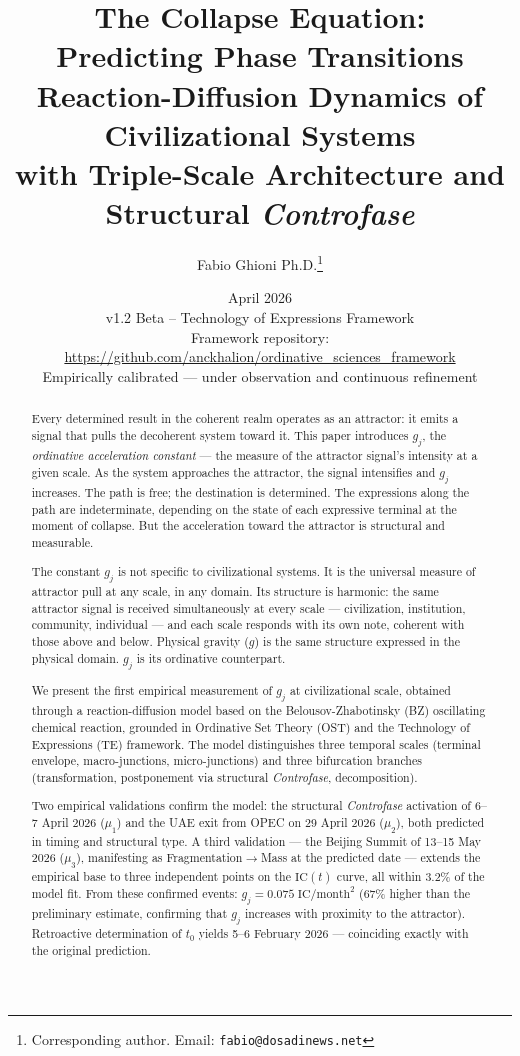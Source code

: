 \documentclass[12pt,a4paper]{article}
\title{\textbf{The Collapse Equation:\\Predicting Phase Transitions}\\[1em]\large Reaction-Diffusion Dynamics of Civilizational Systems\\with Triple-Scale Architecture and Structural \textit{Controfase}}
\author[1]{Fabio Ghioni Ph.D.\thanks{Corresponding author. Email: \texttt{fabio@dosadinews.net}}}
\affil[1]{Ordinative Sciences Foundation Research Labs\\\small\url{https://ordinativescience.foundation}}
\date{April 2026\\[0.5em]\small v1.2 Beta -- Technology of Expressions Framework\\[0.3em]\small Framework repository: \url{https://github.com/anckhalion/ordinative_sciences_framework}\\[0.3em]\small Empirically calibrated --- under observation and continuous refinement}
\newcommand{\gj}{g_j}
\newcommand{\IC}{\mathrm{IC}}
\begin{document}
\maketitle

\begin{abstract}
Every determined result in the coherent realm operates as an attractor: it emits a signal that pulls the decoherent system toward it. This paper introduces $\gj$, the \emph{ordinative acceleration constant} --- the measure of the attractor signal's intensity at a given scale. As the system approaches the attractor, the signal intensifies and $\gj$ increases. The path is free; the destination is determined. The expressions along the path are indeterminate, depending on the state of each expressive terminal at the moment of collapse. But the acceleration toward the attractor is structural and measurable.

The constant $\gj$ is not specific to civilizational systems. It is the universal measure of attractor pull at any scale, in any domain. Its structure is harmonic: the same attractor signal is received simultaneously at every scale --- civilization, institution, community, individual --- and each scale responds with its own note, coherent with those above and below. Physical gravity ($g$) is the same structure expressed in the physical domain. $\gj$ is its ordinative counterpart.

We present the first empirical measurement of $\gj$ at civilizational scale, obtained through a reaction-diffusion model based on the Belousov-Zhabotinsky (BZ) oscillating chemical reaction, grounded in Ordinative Set Theory (OST) and the Technology of Expressions (TE) framework. The model distinguishes three temporal scales (terminal envelope, macro-junctions, micro-junctions) and three bifurcation branches (transformation, postponement via structural \textit{Controfase}, decomposition).

Two empirical validations confirm the model: the structural \textit{Controfase} activation of 6--7 April 2026 ($\mu_1$) and the UAE exit from OPEC on 29 April 2026 ($\mu_2$), both predicted in timing and structural type. A third validation --- the Beijing Summit of 13--15 May 2026 ($\mu_3$), manifesting as Fragmentation$\to$Mass at the predicted date --- extends the empirical base to three independent points on the $\IC(t)$ curve, all within 3.2\% of the model fit. From these confirmed events: $\gj = 0.075\;\mathrm{IC/month}^2$ (67\% higher than the preliminary estimate, confirming that $\gj$ increases with proximity to the attractor). Retroactive determination of $t_0$ yields 5--6 February 2026 --- coinciding exactly with the original prediction.


\end{abstract}
\end{document}

